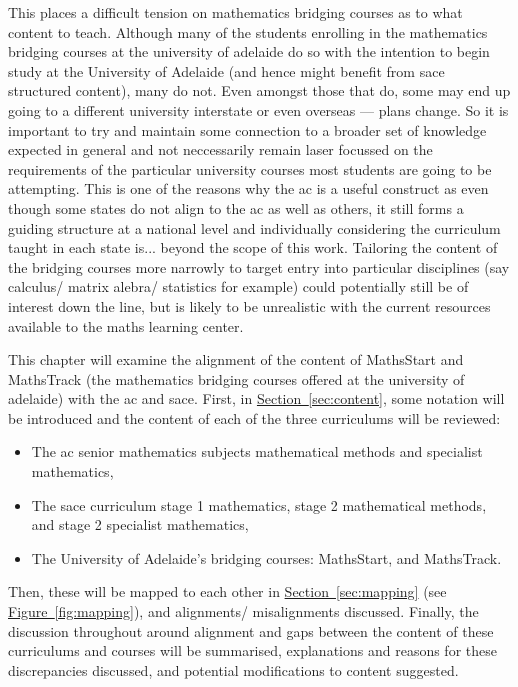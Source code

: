 \documentclass[twoside,12pt,a4paper]{report}
\newcommand{\refsec}[1]{\hyperref[sec:#1]{Section~\ref{sec:#1}}}
\newcommand{\reffig}[1]{\hyperref[fig:#1]{Figure~\ref{fig:#1}}}
\begin{document}
This places a difficult tension on mathematics bridging courses as to what content to teach. Although many of the students enrolling in the mathematics bridging courses at the university of adelaide do so with the intention to begin study at the University of Adelaide (and hence might benefit from \gls{sace} structured content), many do not. Even amongst those that do, some may end up going to a different university interstate or even overseas --- plans change. So it is important to try and maintain some connection to a broader set of knowledge expected in general and not neccessarily remain laser focussed on the requirements of the particular university courses most students are going to be attempting. This is one of the reasons why the \gls{ac} is a useful construct as even though some states do not align to the \gls{ac} as well as others, it still forms a guiding structure at a national level and individually considering the curriculum taught in each state is... beyond the scope of this work. Tailoring the content of the bridging courses more narrowly to target entry into particular disciplines (say calculus/ matrix alebra/ statistics for example) could potentially still be of interest down the line, but is likely to be unrealistic with the current resources available to the maths learning center.

This chapter will examine the alignment of the content of MathsStart and MathsTrack (the mathematics bridging courses offered at the university of adelaide) with the \gls{ac} and \gls{sace}. First, in \refsec{content}, some notation will be introduced and the content of each of the three curriculums will be reviewed:
\begin{itemize}
	\item The \gls{ac} senior mathematics subjects mathematical methods and specialist mathematics,
	\item The \gls{sace} curriculum stage 1 mathematics, stage 2 mathematical methods, and stage 2 specialist mathematics,
	\item The University of Adelaide's bridging courses: MathsStart, and MathsTrack.
\end{itemize}
Then, these will be mapped to each other in \refsec{mapping} (see \reffig{mapping}), and alignments/ misalignments discussed. Finally, the discussion throughout around alignment and gaps between the content of these curriculums and courses will be summarised, explanations and reasons for these discrepancies discussed, and potential modifications to content suggested. 
\end{document}
